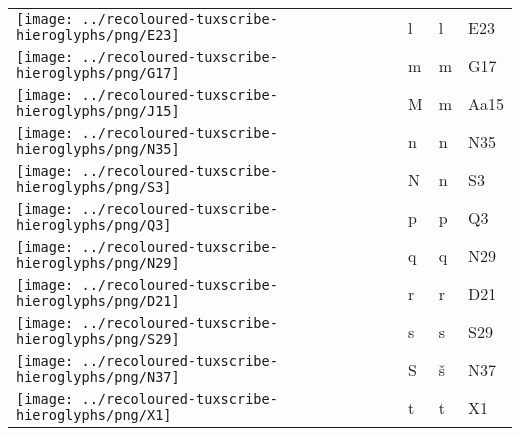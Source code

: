 \begin{center}
\begin{tabularx}{\linewidth}{YYYY}
\vspace{0.30000cm} \texttt{[image: ../recoloured-tuxscribe-hieroglyphs/png/E23]} \vspace{0.30000cm} & l & l & E23 \\ 
\texttt{[image: ../recoloured-tuxscribe-hieroglyphs/png/G17]} & m & m & G17 \\ 
\vspace{0.32500cm} \texttt{[image: ../recoloured-tuxscribe-hieroglyphs/png/J15]} \vspace{0.32500cm} & M & m & Aa15 \\ 
\vspace{0.50000cm} \texttt{[image: ../recoloured-tuxscribe-hieroglyphs/png/N35]} \vspace{0.50000cm} & n & n & N35 \\ 
\texttt{[image: ../recoloured-tuxscribe-hieroglyphs/png/S3]} & N & n & S3 \\ 
\texttt{[image: ../recoloured-tuxscribe-hieroglyphs/png/Q3]} & p & p & Q3 \\ 
\texttt{[image: ../recoloured-tuxscribe-hieroglyphs/png/N29]} & q & q & N29 \\ 
\vspace{0.30000cm} \texttt{[image: ../recoloured-tuxscribe-hieroglyphs/png/D21]} \vspace{0.30000cm} & r & r & D21 \\ 
\texttt{[image: ../recoloured-tuxscribe-hieroglyphs/png/S29]} & s & s & S29 \\ 
\texttt{[image: ../recoloured-tuxscribe-hieroglyphs/png/N37]} & S & š & N37 \\ 
\vspace{0.25000cm} \texttt{[image: ../recoloured-tuxscribe-hieroglyphs/png/X1]} \vspace{0.25000cm} & t & t & X1 \\ 

\end{tabularx}
\end{center}
